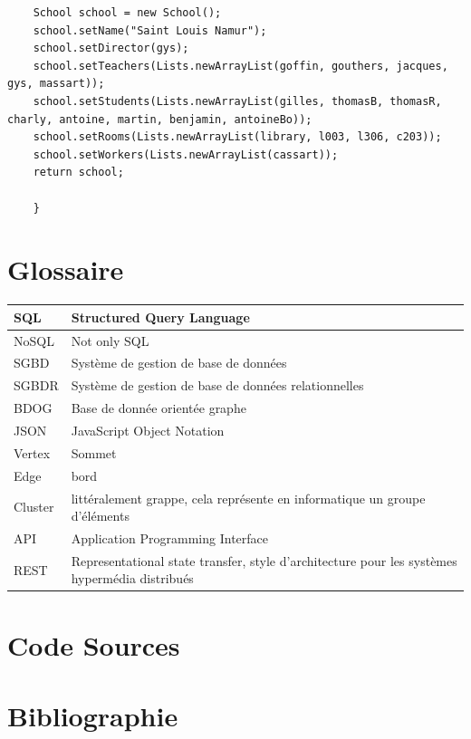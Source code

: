\documentclass[a4paper,fleqn,12pt]{report}
\begin{document}
\begin{lstlisting}
    School school = new School();
    school.setName("Saint Louis Namur");
    school.setDirector(gys);
    school.setTeachers(Lists.newArrayList(goffin, gouthers, jacques, gys, massart));
    school.setStudents(Lists.newArrayList(gilles, thomasB, thomasR, charly, antoine, martin, benjamin, antoineBo));
    school.setRooms(Lists.newArrayList(library, l003, l306, c203));
    school.setWorkers(Lists.newArrayList(cassart));
    return school;

    }
\end{lstlisting}
\label{SchoolObj}

\part{Glossaire}
\begin{center}
\begin{tabular}[c]{ l p{14cm} }
 SQL  & Structured Query Language \\ \hline
 NoSQL  & Not only SQL \\ \hline
 SGBD  & Système de gestion de base de données \\ \hline
 SGBDR  & Système de gestion de base de données relationnelles \\ \hline
 BDOG  & Base de donnée orientée graphe \\ \hline
 JSON  & JavaScript Object Notation \\ \hline
 Vertex  & Sommet \\ \hline
 Edge  & bord \\ \hline
 Cluster  & littéralement grappe, cela représente en informatique un groupe d'éléments \\ \hline
 API  & Application Programming Interface  \\ \hline
 REST  & Representational state transfer, style d'architecture pour les systèmes hypermédia distribués \\ \hline
\end{tabular}
\end{center}

\part{Code Sources}

%

\part{Bibliographie}

\nocite{*}

  
\end{document}
